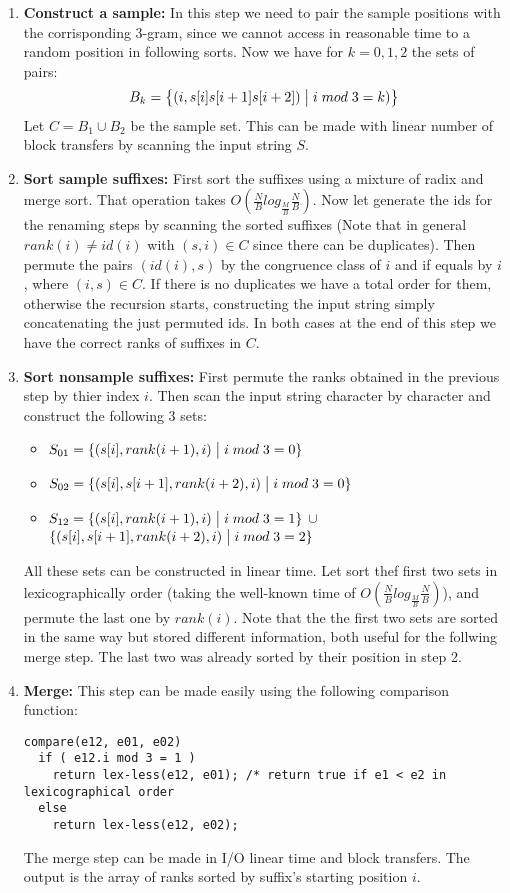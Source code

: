 \documentclass[a4paper]{article}
\begin{document}
\begin{enumerate}
\item \textbf{Construct a sample: } In this step we need to pair the sample positions with the corrisponding 3-gram, since we cannot access in reasonable time to a random position in following sorts. Now we have for $k = 0,1,2$ the sets of pairs:
$$B_k = \bigl\{(i, s[i]s[i+1]s[i+2]) \bigm| i \; mod \; 3 = k)\bigr\}$$ 
Let $C = B_1 \cup B_2$ be the sample set.
This can be made with linear number of block transfers by scanning the input string $S$.

\item \textbf{Sort sample suffixes: } First sort the suffixes using a mixture of radix and merge sort. That operation takes $O(\frac{N}{B} log_{\frac{M}{B}} \frac{N}{B})$.
Now let generate the ids for the renaming steps by scanning the sorted suffixes (Note that in general $rank(i) \neq id(i)$ with $(s, i) \in C$ since there can be duplicates). 
Then permute the pairs $(id(i), s)$ by the congruence class of $i$ and if equals by $i$, where $(i, s) \in C$.
If there is no duplicates we have a total order for them, otherwise the recursion starts, constructing the input string simply concatenating the just permuted ids.
In both cases at the end of this step we have the correct ranks of suffixes in $C$.

\item \textbf{Sort nonsample suffixes: } 
First permute the ranks obtained in the previous step by thier index $i$.
Then scan the input string character by character and construct the following $3$ sets:
\begin{itemize}
\item $S_{01} = \{(s[i], rank(i+1), i) \bigm| i \; mod \; 3 = 0\}$
\item $S_{02} = \{(s[i], s[i+1], rank(i+2), i) \bigm| i \; mod \; 3 = 0\}$
\item $S_{12} = \{(s[i], rank(i+1), i) \bigm| i \; mod \; 3 = 1\}$ $\cup$ $\{(s[i], s[i+1], rank(i+2), i) \bigm| i \; mod \; 3 = 2\}$
\end{itemize}
All these sets can be constructed in linear time. Let sort thef first two sets in lexicographically order (taking the well-known time of $O(\frac{N}{B} log_{\frac{M}{B}} \frac{N}{B})$), and permute the last one by $rank(i)$. Note that the the first two sets are sorted in the same way but stored different information, both useful for the follwing merge step. The last two was already sorted by their position in step 2.

\item \textbf{Merge:}
This step can be made easily using the following comparison function:
\begin{verbatim}
compare(e12, e01, e02) 
  if ( e12.i mod 3 = 1 )  
    return lex-less(e12, e01); /* return true if e1 < e2 in lexicographical order 
  else
    return lex-less(e12, e02);
\end{verbatim}
The merge step can be made in I/O linear time and block transfers.
The output is the array of ranks sorted by suffix's starting position $i$.
\end{enumerate} 
\end{document}
